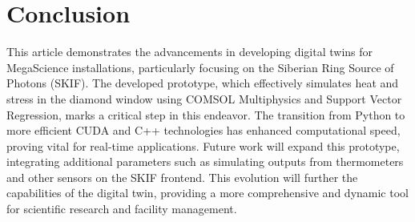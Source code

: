 \section{Conclusion}

This article demonstrates the advancements in developing digital twins for
MegaScience installations, particularly focusing on the Siberian Ring Source of
Photons (SKIF). The developed prototype, which effectively simulates heat and
stress in the diamond window using COMSOL Multiphysics and Support Vector
Regression, marks a critical step in this endeavor. The transition from Python
to more efficient CUDA and C++ technologies has enhanced computational speed,
proving vital for real-time applications. Future work will expand this
prototype, integrating additional parameters such as simulating outputs from
thermometers and other sensors on the SKIF frontend. This evolution will
further the capabilities of the digital twin, providing a more comprehensive
and dynamic tool for scientific research and facility management.
